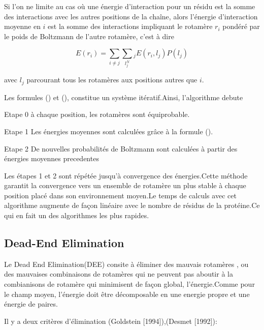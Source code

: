 Si l'on ne limite au cas où une énergie d'interaction pour un résidu est la somme des interactions avec les autres positions de la chaîne, alors l'énergie d'interaction moyenne en $i$ est la somme des interactions impliquant le rotamère $r_i$ pondéré par le poids de Boltzmann de l'autre rotamère, c'est à dire

\begin{equation}
E(r_i) = \sum_{i \neq j} \sum_l_j^N_j E(r_i,l_j)P(l_j)
\end{equation}  

avec $l_j$ parcourant tous les rotamères aux positions autres que $i$.

Les formules () et (), constitue un système itératif.Ainsi, l'algorithme debute


\begin{enumeration}
\item  Etape 0 à chaque position, les rotamères sont équiprobable.
\item  Etape 1 Les énergies moyennes sont calculées grâce à la formule ().
\item  Etape 2 De nouvelles probabilités de Boltzmann sont calculées à partir des énergies moyennes precedentes   
\end{enumeration}


Les étapes 1 et 2 sont répétée jusqu'à convergence des énergies.Cette méthode garantit la convergence vers un ensemble de rotamère un plus stable à chaque position placé dans son \og environnement moyen\fg .Le temps de calculs avec cet algorithme augmente  de façon linéaire avec le nombre de résidus de la protéine.Ce qui en fait un des algorithmes les plus rapides.

\subsection{Dead-End Elimination}

Le \og Dead End Elimination\fg (DEE)  consite à éliminer des mauvais rotamères , ou des mauvaises combinaisons de rotamères qui ne peuvent pas aboutir à la combianisons de rotamère qui minimisent de façon global, l'énergie.Comme pour le champ moyen, l'énergie doit être décomposable en une energie propre et une énergie de paires.

Il y a deux critères d'élimination (Goldstein [1994]),(Desmet [1992]):

